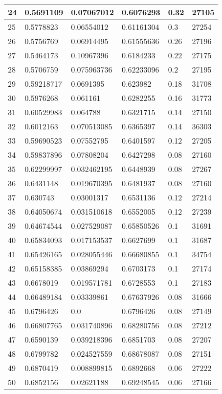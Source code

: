 \begin{longtable}{|l|l|l|l|l|l|}
24 & 0.5691109 & 0.07067012 & 0.6076293 & 0.32 & 27105 \\ \hline 
25 & 0.5778823 & 0.06554012 & 0.61161304 & 0.3 & 27254 \\ \hline 
26 & 0.5756769 & 0.06914495 & 0.61555636 & 0.26 & 27196 \\ \hline 
27 & 0.5464173 & 0.10967396 & 0.6184233 & 0.22 & 27175 \\ \hline 
28 & 0.5706759 & 0.075963736 & 0.62233096 & 0.2 & 27195 \\ \hline 
29 & 0.59218717 & 0.0691395 & 0.623982 & 0.18 & 31708 \\ \hline 
30 & 0.5976268 & 0.061161 & 0.6282255 & 0.16 & 31773 \\ \hline 
31 & 0.60529983 & 0.064788 & 0.6321715 & 0.14 & 27150 \\ \hline 
32 & 0.6012163 & 0.070513085 & 0.6365397 & 0.14 & 36303 \\ \hline 
33 & 0.59690523 & 0.07552795 & 0.6401597 & 0.12 & 27205 \\ \hline 
34 & 0.59837896 & 0.07808204 & 0.6427298 & 0.08 & 27160 \\ \hline 
35 & 0.62299997 & 0.032462195 & 0.6448939 & 0.08 & 27267 \\ \hline 
36 & 0.6431148 & 0.019670395 & 0.6481937 & 0.08 & 27160 \\ \hline 
37 & 0.630743 & 0.03001317 & 0.6531136 & 0.12 & 27214 \\ \hline 
38 & 0.64050674 & 0.031510618 & 0.6552005 & 0.12 & 27239 \\ \hline 
39 & 0.64674544 & 0.027529087 & 0.65850526 & 0.1 & 31691 \\ \hline 
40 & 0.65834093 & 0.017153537 & 0.6627699 & 0.1 & 31687 \\ \hline 
41 & 0.65426165 & 0.028055446 & 0.66680855 & 0.1 & 34754 \\ \hline 
42 & 0.65158385 & 0.03869294 & 0.6703173 & 0.1 & 27174 \\ \hline 
43 & 0.6678019 & 0.019571781 & 0.6728553 & 0.1 & 27183 \\ \hline 
44 & 0.66489184 & 0.03339861 & 0.67637926 & 0.08 & 31666 \\ \hline 
45 & 0.6796426 & 0.0 & 0.6796426 & 0.08 & 27149 \\ \hline 
46 & 0.66807765 & 0.031740896 & 0.68280756 & 0.08 & 27212 \\ \hline 
47 & 0.6590139 & 0.039218396 & 0.6851703 & 0.08 & 27207 \\ \hline 
48 & 0.6799782 & 0.024527559 & 0.68678087 & 0.08 & 27151 \\ \hline 
49 & 0.6870419 & 0.008899815 & 0.6892668 & 0.06 & 27222 \\ \hline 
50 & 0.6852156 & 0.02621188 & 0.69248545 & 0.06 & 27166 \\ \hline 
\end{longtable}